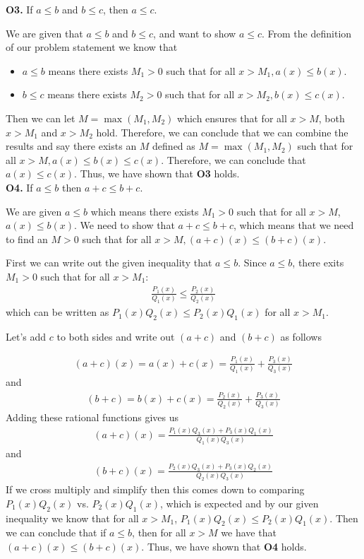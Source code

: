 \documentclass [10pt]{article}
\begin{document}
\begin{enumerate}
\begin{enumerate}
{\textbf{O3.} If $a \leq b$ and $b \leq c$, then $a \leq c$. 

We are given that $a \leq b$ and $b \leq c$, and want to show $a \leq c$. From the definition of our problem statement we know that 
\begin{itemize}
    \item $a \leq b$ means there exists $M_1 > 0$ such that for all $x > M_1, a(x) \leq b(x)$. 
    \item $b \leq c$ means there exists $M_2 > 0$ such that for all $x > M_2, b(x) \leq c(x)$.
\end{itemize}
Then we can let $M = \max(M_1, M_2)$ which ensures that for all $x > M$, both $x > M_1$ and $x > M_2$ hold. Therefore, we can conclude that we can combine the results and say there exists an $M$ defined as $M = \max(M_1, M_2)$ such that for all $x > M, a(x) \leq b(x) \leq c(x)$. Therefore, we can conclude that $a(x) \leq c(x)$. Thus, we have shown that \textbf{O3} holds. \\

\textbf{O4.} If $a \leq b$ then $a + c \leq b + c$. 

We are given $a \leq b$ which means there exists $M_1 > 0$ such that for all $x > M$, $a(x) \leq b(x)$. We need to show that $a + c \leq b + c$, which means that we need to find an $M > 0$ such that for all $x > M, (a + c)(x) \leq (b + c)(x)$. 

First we can write out the given inequality that $a \leq b$. Since $a \leq b$, there exits $M_1 > 0$ such that for all $x > M_1$: 
\begin{align*}
    \frac{P_1(x)}{Q_1(x)} \leq \frac{P_2(x)}{Q_2(x)}
\end{align*}
which can be written as $P_1(x) Q_2(x) \leq P_2(x) Q_1(x)$ for all $x > M_1$.

Let's add $c$ to both sides and write out $(a+c)$ and $(b+c)$ as follows 

\begin{align*}
    (a+c)(x) = a(x) + c(x) = \frac{P_1(x)}{Q_1(x)} + \frac{P_3(x)}{Q_3(x)}
\end{align*}
and 
\begin{align*}
    (b+c) = b(x) + c(x) = \frac{P_2(x)}{Q_2(x)} + \frac{P_3(x)}{Q_3(x)}
\end{align*}
Adding these rational functions gives us 
\begin{align*}
    (a+c)(x) = \frac{P_1(x) Q_3(x) + P_3(x) Q_1(x)}{Q_1(x) Q_3(x)}
\end{align*}
and 
\begin{align*}
    (b+c)(x) =  \frac{P_2(x) Q_3(x) + P_3(x) Q_2(x)}{Q_2(x) Q_3(x)}
\end{align*}
If we cross multiply and simplify then this comes down to comparing $P_1(x) Q_2(x)$ vs. $P_2(x) Q_1(x)$, which is expected and by our given inequality we know that for all $x > M_1$, $P_1(x) Q_2(x) \leq P_2(x) Q_1(x)$. Then we can conclude that if $a \leq b$, then for all $x > M$ we have that $(a + c)(x) \leq (b+c)(x)$. Thus, we have shown that \textbf{O4} holds. \\

}
\end{enumerate}
\end{enumerate}
\end{document}
